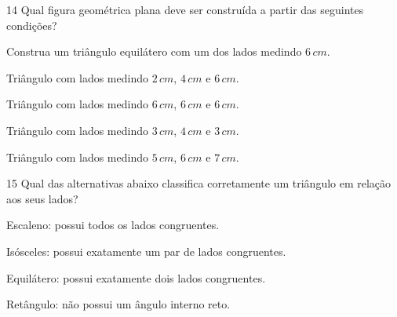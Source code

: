 \num{14} Qual figura geométrica plana deve ser construída a partir das
seguintes condições?

Construa um triângulo equilátero com um dos lados medindo $6\,cm$.

\begin{escolha}
\item Triângulo com lados medindo $2\,cm$, $4\,cm$ e $6\,cm$. 
\item Triângulo com lados
medindo $6\,cm$, $6\,cm$ e $6\,cm$. 
\item Triângulo com lados medindo $3\,cm$, $4\,cm$ e $3\,cm$.
\item Triângulo com lados medindo $5\,cm$, $6\,cm$ e $7\,cm$.
\end{escolha}



\num{15} Qual das alternativas abaixo classifica corretamente um triângulo em
relação aos seus lados?

\begin{escolha}
\item Escaleno: possui todos os lados congruentes.
\item Isósceles: possui exatamente um par de lados congruentes.
\item Equilátero: possui exatamente dois lados congruentes.
\item Retângulo: não possui um ângulo interno reto.
\end{escolha}



